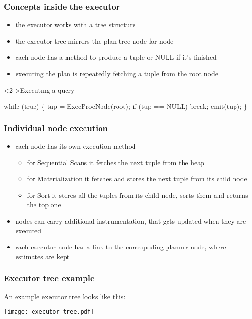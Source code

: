 \documentclass{beamer}
\begin{document}
\begin{frame}[fragile]
  \frametitle{Concepts inside the executor}

  \begin{itemize}
  \item the executor works with a tree structure
  \item the executor tree mirrors the plan tree node for node
  \item each node has a method to produce a tuple or NULL if it's finished
  \item executing the plan is repeatedly fetching a tuple from the root node
  \end{itemize}

  \begin{block}<2->{Executing a query}
    \begin{semiverbatim}
      while (true) \{
          tup = ExecProcNode(root);
          if (tup == NULL)
              break;
          emit(tup);
      \}
    \end{semiverbatim}
  \end{block}
\end{frame}

\begin{frame}
  \frametitle{Individual node execution}

  \begin{itemize}
  \item each node has its own execution method
    \begin{itemize}
    \item for Sequential Scans it fetches the next tuple from the heap
    \item for Materialization it fetches and stores the next tuple from its
      child node
    \item for Sort it stores \alert{all} the tuples from its child node, sorts
      them and returns the top one
    \end{itemize}
  \item nodes can carry additional instrumentation, that gets updated when they
    are executed
  \item each executor node has a link to the correspoding planner node, where
    estimates are kept
  \end{itemize}
\end{frame}

\begin{frame}
  \frametitle{Executor tree example}

  An example executor tree looks like this:
  \begin{center}
    \texttt{[image: executor-tree.pdf]}
  \end{center}
\end{frame}
\end{document}
